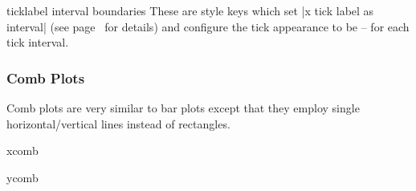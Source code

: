 \begin{pgfplotsxykey}{\x ticklabel interval boundaries}
	These are style keys which set |x tick label as interval| (see page~\pageref{key:pgfplots:ticklabelasinterval} for details) and configure the tick appearance to be  --  for each tick interval.
\end{pgfplotsxykey}

\subsubsection{Comb Plots}
Comb plots are very similar to bar plots except that they employ single horizontal/vertical lines instead of rectangles.

\begin{plottype}{xcomb}
\begin{codeexample}[]
\end{codeexample}
\end{plottype}

\begin{plottype}{ycomb}
\begin{codeexample}[]
\end{codeexample}
\end{plottype}

